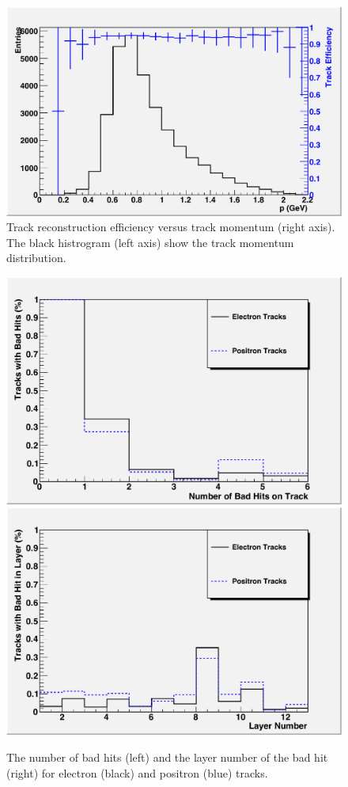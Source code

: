 \begin{figure}
\includegraphics[scale=0.8]{performance/tracking_performance/pzE-Effic.pdf}
\caption{ Track reconstruction efficiency versus track momentum (right axis). The black histrogram (left axis) show the track momentum distribution. }
\label{fig:trkeffic}
\end{figure}

\begin{figure}
\includegraphics[scale=0.4]{performance/tracking_performance/nBadHits.pdf}
\includegraphics[scale=0.4]{performance/tracking_performance/BadLayer.pdf}
\caption{ The number of bad hits (left) and the layer number of the bad hit (right) 
for electron (black) and positron (blue) tracks.   }
\label{fig:badhits}
\end{figure}



